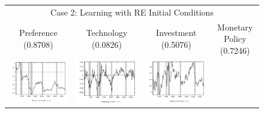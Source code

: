 \begin{figure}
\begin{tabular}{cccc}
\multicolumn{4}{c}{Case 2: Learning with RE Initial Conditions} \\ 
Preference (0.8708) & Technology (0.0826) & Investment (0.5076) & Monetary Policy (0.7246) \\
\includegraphics[scale=0.22]{results_reallinit/prefshock.png} & 
\includegraphics[scale=0.22]{results_reallinit/techshock.png} & 
\includegraphics[scale=0.22]{results_reallinit/invshock.png} & 

\end{tabular}
\end{figure}
